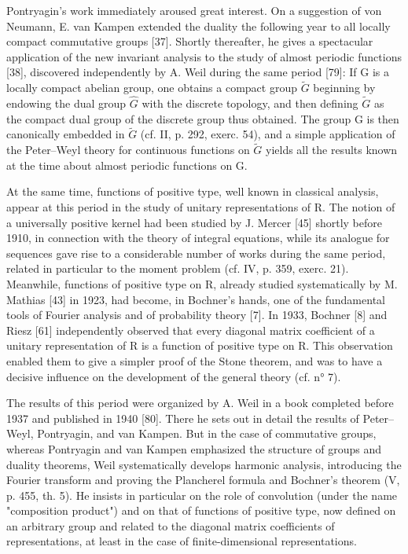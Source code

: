 Pontryagin's work immediately aroused great interest. On a suggestion of von Neumann, E. van Kampen extended the duality the following year to all locally compact commutative groups {[}37{]}. Shortly thereafter, he gives a spectacular application of the new invariant analysis to the study of almost periodic functions {[}38{]}, discovered independently by A. Weil during the same period {[}79{]}: If G is a locally compact abelian group, one obtains a compact group \(\widetilde{G}\) beginning by endowing the dual group \(\widehat{G}\) with the discrete topology, and then defining \(\widetilde{G}\) as the compact dual group of the discrete group thus obtained. The group G is then canonically embedded in \(\widetilde{G}\) (cf. II, p. 292, exerc. 54), and a simple application of the Peter--Weyl theory for continuous functions on \(\widetilde{G}\) yields all the results known at the time about almost periodic functions on G.

At the same time, functions of positive type, well known in classical analysis, appear at this period in the study of unitary representations of R. The notion of a universally positive kernel had been studied by J. Mercer {[}45{]} shortly before 1910, in connection with the theory of integral equations, while its analogue for sequences gave rise to a considerable number of works during the same period, related in particular to the moment problem (cf. IV, p. 359, exerc. 21). Meanwhile, functions of positive type on R, already studied systematically by M. Mathias {[}43{]} in 1923, had become, in Bochner's hands, one of the fundamental tools of Fourier analysis and of probability theory {[}7{]}. In 1933, Bochner {[}8{]} and Riesz {[}61{]} independently observed that every diagonal matrix coefficient of a unitary representation of R is a function of positive type on R. This observation enabled them to give a simpler proof of the Stone theorem, and was to have a decisive influence on the development of the general theory (cf. n° 7).

The results of this period were organized by A. Weil in a book completed before 1937 and published in 1940 {[}80{]}. There he sets out in detail the results of Peter--Weyl, Pontryagin, and van Kampen. But in the case of commutative groups, whereas Pontryagin and van Kampen emphasized the structure of groups and duality theorems, Weil systematically develops harmonic analysis, introducing the Fourier transform and proving the Plancherel formula and Bochner's theorem (V, p. 455, th. 5). He insists in particular on the role of convolution (under the name "composition product") and on that of functions of positive type, now defined on an arbitrary group and related to the diagonal matrix coefficients of representations, at least in the case of finite-dimensional representations.

